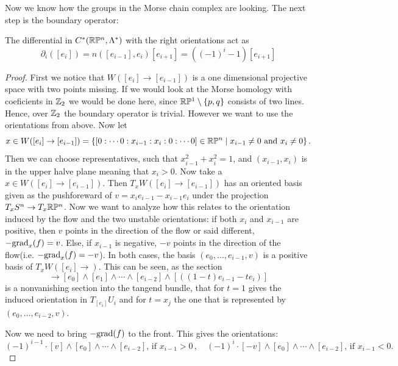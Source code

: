 \begin{example}
\begin{definition}[Orientations]
\begin{center}
				\end{center}
			\end{definition}
			Now we know how the groups in the Morse chain complex are looking. The next step is the boundary operator:
			\begin{lemma}
				The differential in $C^*(\mathbb{R}\mathbb{P}^n,\Lambda^*)$ with the right orientations act as
						\begin{equation*}
					\partial_i([e_i])=n([e_{i-1}],e_i) [e_{i+1}]= ({(-1)}^i-1)[e_{i+1}]
				\end{equation*}	
			\end{lemma}
		\begin{proof}
			First we notice that $W([e_i]\to [e_{i-1}])$ is a one dimensional projective space with two points missing. If we would look at the Morse homology with coeficients in $\mathbb{Z}_2$ we would be done here, since $\mathbb{R}\mathbb{P}^1\setminus \{p,q\}$ consists of two lines. Hence, over $\mathbb{Z}_2$ the boundary operator is trivial. However we want to use the orientations from above.
			Now let 
			\begin{equation*}
				x\in W([e_i]\to [e_{i-1}])=\{[0:\cdots 0:x_{i-1}:x_{i}:0:\cdots 0]\in \mathbb{R}\mathbb{P}^n \mid x_{i-1}\neq 0 \text{ and }x_i\neq 0 \}\,.
			\end{equation*} Then we can choose representatives, such that $x_{i-1}^2+x_i^2=1$, and $(x_{i-1},x_i)$ is in the upper halve plane meaning that $x_i>0$. Now take a $x\in W([e_i]\to [e_{i-1}])$. Then $T_xW([e_i]\to [e_{i-1}])$ has an oriented basis given as the pushforeward of $v=x_{i}e_{i-1}-x_{i-1}e_{i}$ under the projection $T_xS^n\to T_x\mathbb{R}\mathbb{P}^n$. Now we want to analyze how this relates to the orientation induced by the flow and the two unstable orientations: if both $x_i$ and $x_{i-1}$ are positive, then $v$ points in the direction of the flow or said different, $-\mathrm{grad}_x(f)=v$. Else, if $x_{i-1}$ is negative, $-v$ points in the direction of the flow(i.e. $-\mathrm{grad}_x(f)=-v$). 
			In both cases, the basis $(e_0,\dots,e_{i-1},v)$ is a positive basis of $T_xW([e_i]\to)$. This can be seen, as the section
			\begin{equation*}
				[0:\cdots:0,1-t,t,0,\cdots,0]\to [e_0]\wedge[ e_1]\wedge\cdots \wedge [e_{i-2}]\wedge [((1-t)e_{i-1}-te_i)]
			\end{equation*} is a nonvanishing section into the tangend bundle, that for $t=1$ gives the induced orientation in $T_[e_i]U_i$ and for $t=x_j$ the one that is represented by $(e_0,\dots,e_{i-2},v)$.
			
			Now we need to bring $-\mathrm{grad}(f)$ to the front. This gives the  orientations:
			\begin{equation*}
				(-1)^{i-1}\cdot [v]\wedge [e_0] \wedge \cdots \wedge [e_{i-2}] \text{, if $x_{i-1}>0$}\,,\quad (-1)^{i}\cdot [-v]\wedge [e_0] \wedge \cdots \wedge [e_{i-2}] \text{, if $x_{i-1}<0$.}
			\end{equation*}


\end{proof}
\end{example}
